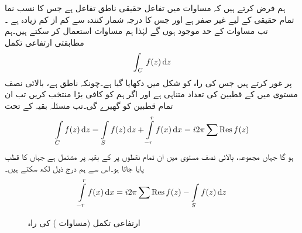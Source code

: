 ہم فرض کرتے ہیں کہ مساوات  میں تفاعل  حقیقی ناطق تفاعل ہے جس کا نسب نما تمام حقیقی  کے لیے غیر صفر ہے اور جس کا درجہ شمار کنندہ  سے کم از کم  زیادہ ہے ۔تب  مساوات  کے حد موجود ہوں گے لہٰذا ہم  مساوات  استعمال کر سکتے ہیں۔ہم مطابقتی ارتفاعی تکمل
\begin{align}\label{مساوات_بقیہ_تکمل_ارتفاعی}
\int_C\, f(z)\dif z
\end{align}
پر غور کرتے ہیں جس کی راہ  کو شکل  میں دکھایا گیا ہے۔چونکہ  ناطق ہے، بالائی نصف مستوی میں  کے قطبین کی تعداد متناہی ہے اور اگر ہم  کو کافی بڑا منتخب کریں تب  ان تمام قطبین کو گھیرے گی۔تب مسئلہ بقیہ کے تحت
\begin{align*}
\int\limits_C f(z)\dif z=\int\limits_S f(z)\dif z+\int\limits_{-r}^{r} f(x)\dif x=i2\pi\sum \Res f(z)
\end{align*}
ہو گا جہاں مجموعہ، بالائی نصف مستوی میں ان تمام نقطوں پر  کے  بقیہ پر مشتمل  ہے جہاں  کا قطب پایا جاتا ہو۔اس سے ہم درج ذیل لکھ سکتے ہیں۔
\begin{align}\label{مساوات_بقیہ_ناطق_اور_مجموعہ_بقیہ}
\int\limits_{-r}^{r}f(x)\dif x=i2\pi\sum \Res f(z)-\int\limits_S f(z)\dif z
\end{align}
%
\begin{figure}
\centering
{}
\caption{ارتفاعی تکمل (مساوات ) کی راہ}
\label{شکل_مساوات_بقیہ_تکمل_ارتفاعی}
\end{figure}

